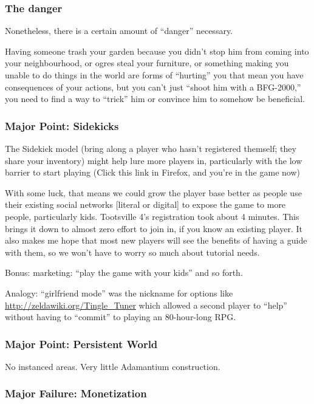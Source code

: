 \documentclass[11pt]{article}
\begin{document}
\subsubsection{The danger}
\label{sec-1-1-9}

Nonetheless, there is a certain amount of “danger” necessary.

Having someone trash your garden because you didn't stop him from
coming into your neighbourhood, or ogres steal your furniture, or
something making you unable to do things in the world are forms of
“hurting” you that mean you have consequences of your actions, but you
can't just “shoot him with a BFG-2000,” you need to find a way to
“trick” him or convince him to somehow be beneficial.
\subsubsection{Major Point: Sidekicks}
\label{sec-1-1-10}

The Sidekick model (bring along a player who hasn't registered
themself; they share your inventory) might help lure more players in,
particularly with the low barrier to start playing (Click this link in
Firefox, and you're in the game now)

With some  luck, that means  we could grow  the player base  better as
people  use their  existing social  networks [literal  or digital]  to
expose  the game  to more  people, particularly  kids. Tootsville  4's
registration took about 4 minutes. This  brings it down to almost zero
effort to join  in, if you know  an existing player. It  also makes me
hope that  most new players  will see the  benefits of having  a guide
with them, so we won't have to worry so much about tutorial needs.

Bonus: marketing: “play the game with your kids” and so forth.

Analogy:  “girlfriend   mode”  was  the  nickname   for  options  like
\url{http://zeldawiki.org/Tingle_Tuner}  which allowed  a  second player  to
“help” without having to “commit” to playing an 80-hour-long RPG.
\subsubsection{Major Point: Persistent World}
\label{sec-1-1-11}

No instanced areas. Very little Adamantium construction.
\subsubsection{Major Failure: Monetization}
\label{sec-1-1-12}
\end{document}
